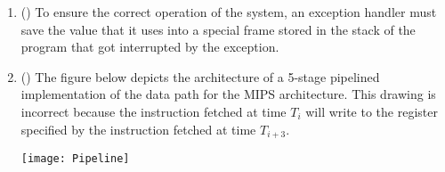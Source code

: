 \documentclass[psfig,11pt]{article}
\newcommand{\REM}[1]{}
\newcommand{\sol}[1]{\REM{#1}}
\begin{document}
\begin{question}[20]
\begin{enumerate}
\item (\hspace{0.2in}\sol{\bf F\ }) To ensure the correct operation of
  the system, an exception handler must save the value that it uses
  into a special frame stored in the stack of the program that got
  interrupted by the exception.

\item (\hspace{0.2in}\sol{\bf T\ }) The figure below depicts the
  architecture of a 5-stage pipelined implementation of the data path
  for the MIPS architecture. This drawing is incorrect because the
  instruction fetched at time $T_i$ will write to the register
  specified by the instruction fetched at time $T_{i+3}$.
\begin{center}
       \texttt{[image: Pipeline]}
\end{center}

\end{enumerate}
\end{question}
\end{document}

